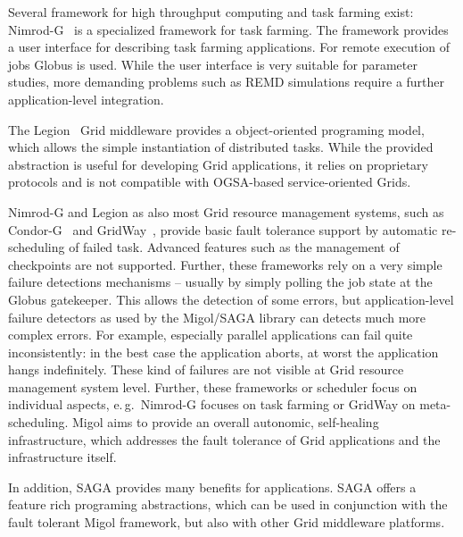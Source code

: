 \documentclass[times, 10pt,twocolumn]{article}
\begin{document}
Several framework for high throughput computing and task farming exist:
Nimrod-G~\cite{buyya00nimrodg} is a specialized framework for task farming. The framework provides a user interface for describing task farming applications. For remote execution of jobs Globus is used. While the user interface is very suitable for parameter studies, more demanding problems such as REMD simulations require a further application-level integration.

The Legion~\cite{689541} Grid middleware provides a object-oriented programing model, which allows the simple instantiation of distributed tasks. While the provided abstraction is useful for developing Grid applications, it relies on proprietary protocols and is not compatible with OGSA-based service-oriented Grids.

Nimrod-G and Legion as also most Grid resource management systems, such as Condor-G~\cite{citeulike:291860} and GridWay~\cite{Montero05}, provide basic fault tolerance support by automatic re-scheduling of failed task. Advanced features such as the management of checkpoints are not supported. Further, these frameworks rely on a very simple failure detections mechanisms -- usually by simply polling the job state at the Globus gatekeeper. This allows the detection of some errors, but application-level failure detectors as used by the Migol/SAGA library can detects much more complex errors. For example, especially parallel applications can fail quite inconsistently: in the best case the application aborts, at worst the application hangs indefinitely. These kind of failures are not visible at Grid resource management system level. Further, these frameworks or scheduler focus on individual aspects, e.\,g.\ Nimrod-G focuses on task farming or GridWay on meta-scheduling. Migol aims to provide an overall autonomic, self-healing infrastructure, which addresses the fault tolerance of Grid applications and the infrastructure itself. 

In addition, SAGA provides many benefits for applications.  SAGA offers a feature rich programing abstractions, which can be used in conjunction with the fault tolerant Migol framework, but also with other Grid middleware platforms.



\end{document}
